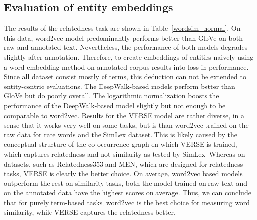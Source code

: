\subsection{Evaluation of entity embeddings}\label{subsec:eval_entity}
The results of the relatedness task are shown in Table~\ref{wordsim_normal}. On this data, word2vec model predominantly performs better than GloVe on both raw and annotated text. Nevertheless, the performance of both models degrades slightly after annotation. 
Therefore, to create embeddings of entities naively using a word embedding method on annotated corpus results into loss in performance. Since all dataset consist mostly of terms, this deduction can not be extended to entity-centric evaluations. The DeepWalk-based models perform better than GloVe but do poorly overall. The logarithmic normalization boosts the performance of the DeepWalk-based model slightly but not enough to be comparable to word2vec. Results for the VERSE model are rather diverse, in a sense that it works very well on some tasks, but is than word2vec trained on the raw data for rare words and the SimLex dataset. This is likely caused by the conceptual structure of the co-occurrence graph on which VERSE is trained, which captures relatedness and not similarity as tested by SimLex. Whereas on datasets, such as Relatedness353 and MEN, which are designed for relatedness tasks, VERSE is clearly the better choice. On average, word2vec based models outperform the rest on similarity tasks, both the model trained on raw text and on the annotated data have the highest scores on average. Thus, we can conclude that for purely term-based tasks, word2vec is the best choice for measuring word similarity, while VERSE captures the relatedness better. 

